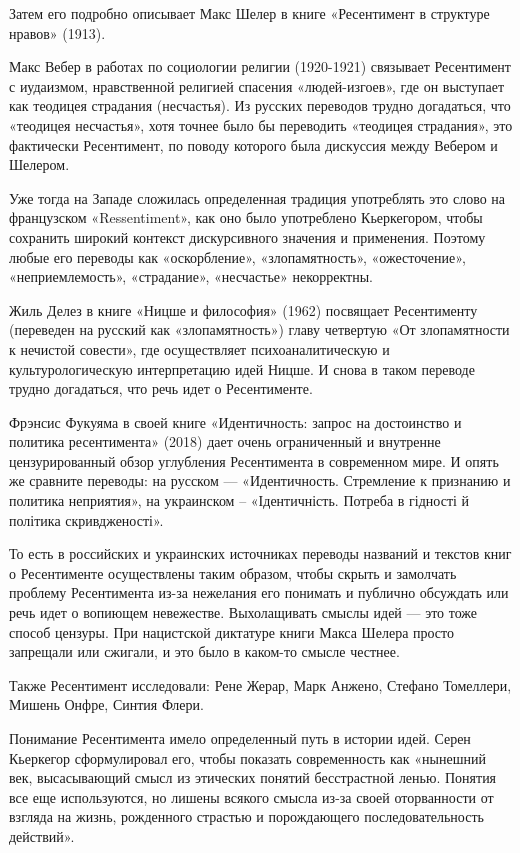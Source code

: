Затем его подробно описывает Макс Шелер в книге «Ресентимент в структуре
нравов» (1913).

Макс Вебер в работах по социологии религии (1920-1921) связывает Ресентимент с
иудаизмом, нравственной религией спасения «людей-изгоев», где он выступает как
теодицея страдания (несчастья). Из русских переводов трудно догадаться, что
«теодицея несчастья», хотя точнее было бы переводить «теодицея страдания», это
фактически Ресентимент, по поводу которого была дискуссия между Вебером и
Шелером.

Уже тогда на Западе сложилась определенная традиция употреблять это слово на
французском «Ressentiment», как оно было употреблено Кьеркегором, чтобы
сохранить широкий контекст дискурсивного значения и применения. Поэтому любые
его переводы как «оскорбление», «злопамятность», «ожесточение»,
«неприемлемость», «страдание», «несчастье» некорректны.

Жиль Делез в книге «Ницше и философия» (1962) посвящает Ресентименту (переведен
на русский как «злопамятность») главу четвертую «От злопамятности к нечистой
совести», где осуществляет психоаналитическую и культурологическую
интерпретацию идей Ницше. И снова в таком переводе трудно догадаться, что речь
идет о Ресентименте.

Фрэнсис Фукуяма в своей книге «Идентичность: запрос на достоинство и политика
ресентимента» (2018) дает очень ограниченный и внутренне цензурированный обзор
углубления Ресентимента в современном мире. И опять же сравните переводы: на
русском — «Идентичность. Стремление к признанию и политика неприятия», на
украинском – «Ідентичність. Потреба в гідності й політика скривдженості».

То есть в российских и украинских источниках переводы названий и текстов книг о
Ресентименте осуществлены таким образом, чтобы скрыть и замолчать проблему
Ресентимента из-за нежелания его понимать и публично обсуждать или речь идет о
вопиющем невежестве. Выхолащивать смыслы идей — это тоже способ цензуры. При
нацистской диктатуре книги Макса Шелера просто запрещали или сжигали, и это
было в каком-то смысле честнее.

Также Ресентимент исследовали: Рене Жерар, Марк Анжено, Стефано Томеллери,
Мишень Онфре, Синтия Флери.

Понимание Ресентимента имело определенный путь в истории идей. Серен Кьеркегор
сформулировал его, чтобы показать современность как «нынешний век, высасывающий
смысл из этических понятий бесстрастной ленью. Понятия все еще используются, но
лишены всякого смысла из-за своей оторванности от взгляда на жизнь, рожденного
страстью и порождающего последовательность действий».

